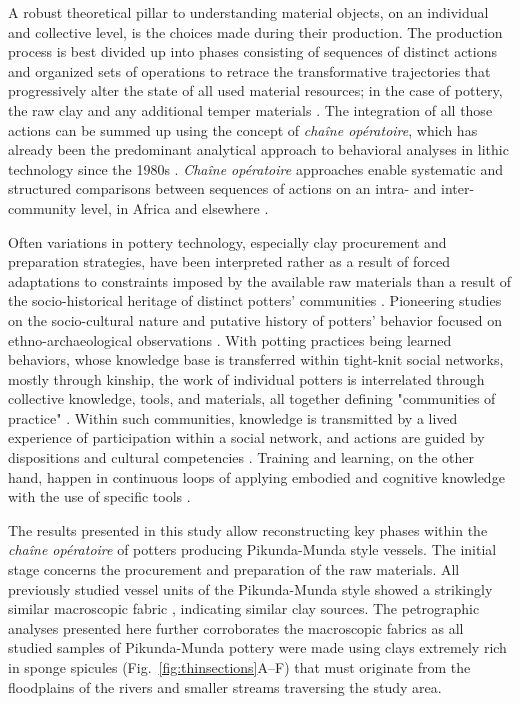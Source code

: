 \documentclass[smallextended,natbib]{svjour3}       %
\begin{document}
A robust theoretical pillar to understanding material objects, on an individual and collective level, is the choices made during their production. The production process is best divided up into phases consisting of sequences of distinct actions and organized sets of operations to retrace the transformative trajectories that progressively alter the state of all used material resources; in the case of pottery, the raw clay and any additional temper materials \citep[3--4]{Gosselain.2018}. The integration of all those actions can be summed up using the concept of \textit{chaîne opératoire}, which has already been the predominant analytical approach to behavioral analyses in lithic technology since the 1980s \citep{Tixier.1980,Tixier.1984,Pelegrin.1988}. \textit{Chaîne opératoire} approaches enable systematic and structured comparisons between sequences of actions on an intra- and inter-community level, in Africa \citep{Gosselain.1992,Gallay.1998,Gosselain.2002,LivingstoneSmith.2007a,Mayor.2011a,MMbogori.2015,Delvoye.2016,Delvoye.2022} and elsewhere \citep[see for example][]{Manem.2008,Ard.2014,Gomart.2014,Gaffney.2020,Heitz.2023}.

Often variations in pottery technology, especially clay procurement and preparation strategies, have been interpreted rather as a result of forced adaptations to constraints imposed by the available raw materials \citep{Braun.1983,Tite.1999,Rice.2015} than a result of the socio-historical heritage of distinct potters' communities \citep{McIntosh.1995,Gosselain.2010,Roux.2017,Gosselain.2018,Roux.2019}. Pioneering studies on the socio-cultural nature and putative history of potters' behavior focused on ethno-archaeological observations \citep{Lechtman.1977}. With potting practices being learned behaviors, whose knowledge base is transferred within tight-knit social networks, mostly through kinship, the work of individual potters is interrelated through collective knowledge, tools, and materials, all together defining "communities of practice" \citep{Wenger.1998,Lave.1991a,Lave.1991,Roddick.2016}. Within such communities, knowledge is transmitted by a lived experience of participation within a social network, and actions are guided by dispositions and cultural competencies \citep{Heitz.2017a}. Training and learning, on the other hand, happen in continuous loops of applying embodied and cognitive knowledge with the use of specific tools \citep{Kuijpers.2018a}.

The results presented in this study allow reconstructing key phases within the \textit{chaîne opératoire} of potters producing Pikunda-Munda style vessels. The initial stage concerns the procurement and preparation of the raw materials. All previously studied vessel units of the Pikunda-Munda style \citep[114--120]{Seidensticker.2021e} showed a strikingly similar macroscopic fabric \citep[62 Tab.~11,69 Tab.~12]{Seidensticker.2021e}, indicating similar clay sources. The petrographic analyses presented here further corroborates the macroscopic fabrics as all studied samples of Pikunda-Munda pottery were made using clays extremely rich in sponge spicules (Fig.~\ref{fig:thinsections}A--F) that must originate from the floodplains of the rivers and smaller streams traversing the study area.
\end{document}
